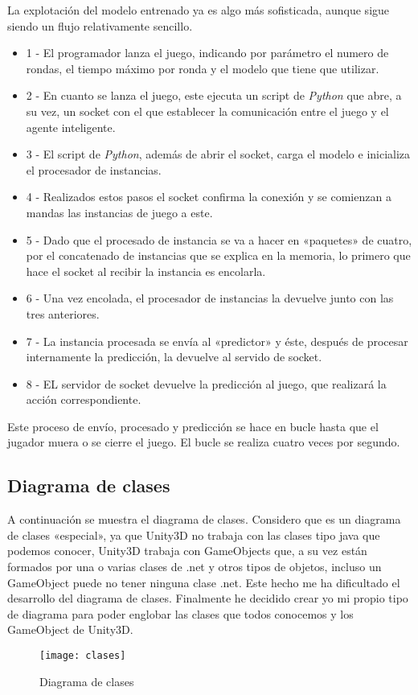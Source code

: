 La explotación del modelo entrenado ya es algo más sofisticada, aunque sigue siendo un flujo relativamente sencillo.
\begin{itemize}
    \item 1 - El programador lanza el juego, indicando por parámetro el numero de rondas, el tiempo máximo por ronda y el modelo que tiene que utilizar.
    \item 2 - En cuanto se lanza el juego, este ejecuta un script de \emph{Python} que abre, a su vez, un socket con el que establecer la comunicación entre el juego y el agente inteligente.
    \item 3 - El script de \emph{Python}, además de abrir el socket, carga el modelo e inicializa el procesador de instancias.
    \item 4 - Realizados estos pasos el socket confirma la conexión y se comienzan a mandas las instancias de juego a este.
    \item 5 - Dado que el procesado de instancia se va a hacer en «paquetes» de cuatro, por el concatenado de instancias que se explica en la memoria, lo primero que hace el socket al recibir la instancia es encolarla.
    \item 6 - Una vez encolada, el procesador de instancias la devuelve junto con las tres anteriores.
    \item 7 - La instancia procesada se envía al «predictor» y éste, después de procesar internamente la predicción, la devuelve al servido de socket.
    \item 8 - EL servidor de socket devuelve la predicción al juego, que realizará la acción correspondiente.
\end{itemize}

Este proceso de envío, procesado y predicción se hace en bucle hasta que el jugador muera o se cierre el juego. El bucle se realiza cuatro veces por segundo.


\subsection {Diagrama de clases}
A continuación se muestra el diagrama de clases. Considero que es un diagrama de clases «especial», ya que Unity3D no trabaja con las clases tipo java que podemos conocer, Unity3D trabaja con GameObjects que, a su vez están formados por una o varias clases de .net y otros tipos de objetos, incluso un GameObject puede no tener ninguna clase .net. Este hecho me ha dificultado el desarrollo del diagrama de clases. Finalmente he decidido crear yo mi propio tipo de diagrama para poder englobar las clases que todos conocemos y los GameObject de Unity3D.


\begin{figure}
    \centering
    \texttt{[image: clases]}
    \caption{Diagrama de clases}
    \label{fig:d_clases}
\end{figure}
